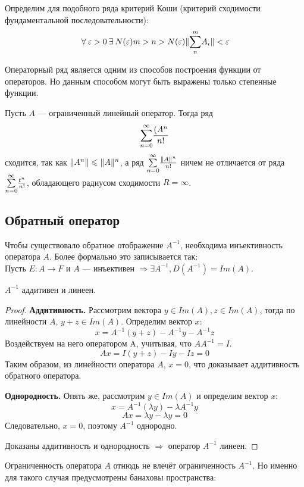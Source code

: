 	Определим для подобного ряда критерий Коши (критерий сходимости фундаментальной последовательности):
	$$\forall \varepsilon > 0 \exists N(\varepsilon) m > n > N(\varepsilon) \norm{ \Sum{n}{m} A_i } < \varepsilon$$
	
	Операторный ряд является одним из способов построения функции от операторов. Но данным способом могут быть выражены только степенные
	функции.
	
	\example Пусть $A$ --- ограниченный линейный оператор. Тогда ряд 
	$$\underset{n = 0}{\overset{\infty}{\sum}} \frac{(A^n}{n!}$$
	сходится, так как $\| A^n \| \leqslant \| A \|^n$, а ряд $\underset{n=0}{\overset{\infty}{\sum}} \frac{\| A \|^n}{n!}$ ничем не отличается от ряда
	$\underset{n=0}{\overset{\infty}{\sum}} \frac{t^n}{n!}$, обладающего радиусом сходимости $R = \infty$.
	
	\subsection*{Обратный оператор}
	
	Чтобы существовало обратное отображение $A^{-1}$, необходима инъективность оператора $A$. Более формально это записывается так: \\
	Пусть $E : A \rightarrow F$ и $A$ --- инъективен $\Rightarrow \exists A^{-1}, D(A^{-1}) = Im(A)$.
	
	\begin{state}
		$A^{-1}$ аддитивен и линеен.
	\end{state}
	\begin{proof}
		\textbf{Аддитивность.} Рассмотрим вектора $y \in Im(A), z \in Im(A)$, тогда по линейности $A$, $y + z \in Im(A)$.
		Определим вектор $x$:
		$$x = A^{-1}(y + z) - A^{-1} y - A^{-1} z$$
		Воздействуем на него оператором A, учитывая, что $A A^{-1} = I$.
		$$Ax = I(y + z) - I y - I z = 0$$
		Таким образом, из линейности оператора $A$, $x = 0$, что доказывает аддитивность обратного оператора.
		
		\textbf{Однородность.} Опять же, рассмотрим $y \in Im(A)$ и определим вектор $x$:
		$$ x = A^{-1}(\lambda y) - \lambda A^{-1} y $$
		$$ Ax = \lambda y - \lambda y = 0 $$
		Следовательно, $x = 0$, поэтому $A^{-1}$ однородно.
		
		Доказаны аддитивность и однородность $\Rightarrow$ оператор $A^{-1}$ линеен.
	\end{proof}
	
	Ограниченность оператора $A$ отнюдь не влечёт ограниченность $A^{-1}$. Но именно для такого случая предусмотрены банаховы 
	пространства:
	

